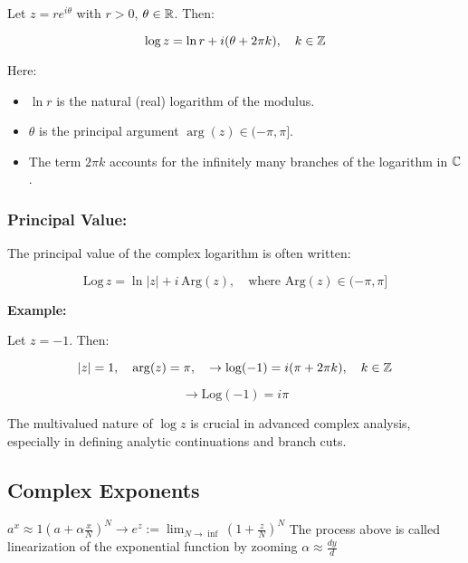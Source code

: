 Let \( z = re^{i\theta} \) with \( r > 0 \), \( \theta \in \mathbb{R} \). Then:

\[
	\log z = \ln r + i(\theta + 2\pi k), \quad k \in \mathbb{Z}
\]

Here:

\begin{itemize}
	
	\item \( \ln r \) is the natural (real) logarithm of the modulus.
	
	\item \( \theta \) is the principal argument \( \arg(z) \in (-\pi, \pi] \).
	
	\item The term \( 2\pi k \) accounts for the infinitely many branches of the logarithm in 
		  \( \mathbb{C} \).

		\end{itemize}

\subsubsection*{Principal Value:}

The principal value of the complex logarithm is often written:

\[
	\mathrm{Log}\,z = \ln |z| + i\,\mathrm{Arg}(z), \quad \text{where } \mathrm{Arg}(z) \in (-\pi, \pi]
\]

\textbf{Example:}
\vspace{\baselineskip}

Let \( z = -1 \). Then:

\[
	|z| = 1, \quad \arg(z) = \pi, \quad \to \log(-1) = i(\pi + 2\pi k), \quad k \in \mathbb{Z}
\]

\[
	\to \mathrm{Log}(-1) = i\pi
\]

The multivalued nature of \( \log z \) is crucial in advanced complex analysis, especially in defining 
analytic continuations and branch cuts.

\subsection{Complex Exponents}

\(a^x \approx 1 {\left(a + \alpha \frac{x}{N} \right)}^N \to e^z := \lim_{N \rightarrow \inf} 
{\left( 1 + \frac{z}{N}\right)}^N \) The process above is called linearization of the exponential 
function by zooming  \(\alpha \approx \frac{dy}{d}\)
\vspace{\baselineskip}

